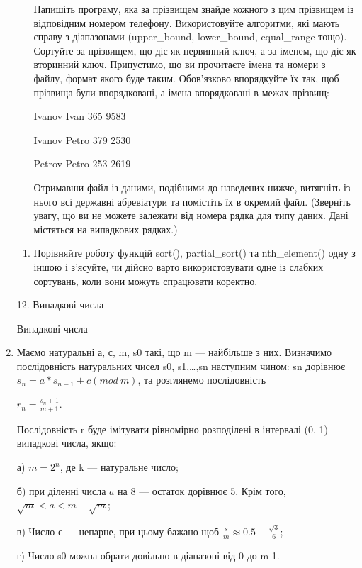 \documentclass[]{article}
\begin{document}
\begin{enumerate}
\begin{itemize}
  Напишіть програму, яка за прізвищем знайде кожного з цим прізвищем із
  відповідним номером телефону. Використовуйте алгоритми, які мають
  справу з діапазонами (upper\_bound, lower\_bound, equal\_range тощо).
  Сортуйте за прізвищем, що діє як первинний ключ, а за іменем, що діє
  як вторинний ключ. Припустимо, що ви прочитаєте імена та номери з
  файлу, формат якого буде таким. Обов'язково впорядкуйте їх так, щоб
  прізвища були впорядковані, а імена впорядковані в межах прізвищ:

  Ivanov Ivan 365 9583

  Ivanov Petro 379 2530

  Petrov Petro 253 2619

  Отримавши файл із даними, подібними до наведених нижче, витягніть із
  нього всі державні абревіатури та помістіть їх в окремий файл.
  (Зверніть увагу, що ви не можете залежати від номера рядка для типу
  даних. Дані містяться на випадкових рядках.)
\end{itemize}

\begin{enumerate}
\def\labelenumi{\arabic{enumi}.}
\item
  Порівняйте роботу функцій sort(), partial\_sort() та nth\_element()
  одну з іншою і з'ясуйте, чи дійсно варто використовувати одне із
  слабких сортувань, коли вони можуть спрацювати коректно.
\end{enumerate}


12. Випадкові числа

Випадкові числа


\def\labelenumi{\arabic{enumi}.}
\item

Маємо натуральні а, с, m, s0 такі, що m --- найбільше з них. Визначимо
послідовність натуральних чисел s0, s1,\ldots{},sn наступним чином: sn
дорівнює \(s_{n} = a*s_{n - 1} + c(mod\ m)\), та розглянемо
послідовність

\(r_{n} = \frac{s_{n} + 1}{m + 1}\).

Послідовність r буде імітувати рівномірно розподілені в інтервалі (0, 1)
випадкові числа, якщо:

а) \({m = 2}^{n}\), де k --- натуральне число;

б) при діленні числа \(a\) на 8 --- остаток дорівнює 5. Крім того,
\(\sqrt{m} < a < m - \sqrt{m}\);

в) Число с --- непарне, при цьому бажано щоб
\(\frac{s}{m} \approx 0.5 - \frac{\sqrt{3}}{6}\);

г) Число s0 можна обрати довільно в діапазоні від 0 до m-1.


\end{enumerate}
\end{document}
